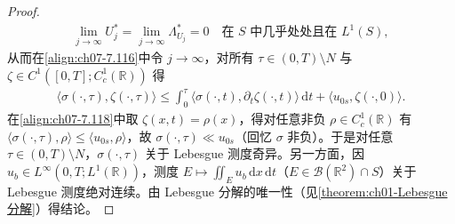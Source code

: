 \documentclass[../../main.tex]{subfiles}%
\begin{document}
\begin{proof}
\begin{align}
\lim_{j\to\infty}U_j^*=\lim_{j\to\infty}\Lambda_{U_j}^*=0\quad\text{在 }S\text{ 中几乎处处且在 }L^1(S), \label{align:ch07-7.117}
\end{align}
从而在\eqref{align:ch07-7.116}中令 $j\to\infty$，对所有 $\tau\in(0,T)\setminus N$ 与 $\zeta\in C^1([0,T];C^1_c(\mathbb{R}))$ 得
\begin{align}
\langle\sigma(\cdot,\tau),\zeta(\cdot,\tau)\rangle
\leqslant\int_0^\tau\langle\sigma(\cdot,t),\partial_t\zeta(\cdot,t)\rangle\,\mathrm{d}t+\langle u_{0s},\zeta(\cdot,0)\rangle. \label{align:ch07-7.118}
\end{align}
在\eqref{align:ch07-7.118}中取 $\zeta(x,t)=\rho(x)$，得对任意非负 $\rho\in C^1_c(\mathbb{R})$ 有 $\langle\sigma(\cdot,\tau),\rho\rangle\leqslant\langle u_{0s},\rho\rangle$，故 $\sigma(\cdot,\tau)\ll u_{0s}$（回忆 $\sigma$ 非负）。于是对任意 $\tau\in(0,T)\setminus N$，$\sigma(\cdot,\tau)$ 关于 Lebesgue 测度奇异。另一方面，因 $u_b\in L^\infty(0,T;L^1(\mathbb{R}))$，测度 $E\mapsto\iint_E u_b\,\mathrm{d}x\,\mathrm{d}t$（$E\in\mathcal{B}(\mathbb{R}^2)\cap S$）关于 Lebesgue 测度绝对连续。由 Lebesgue 分解的唯一性（见\cref{theorem:ch01-Lebesgue分解}）得结论。
\end{proof}
\end{document}
